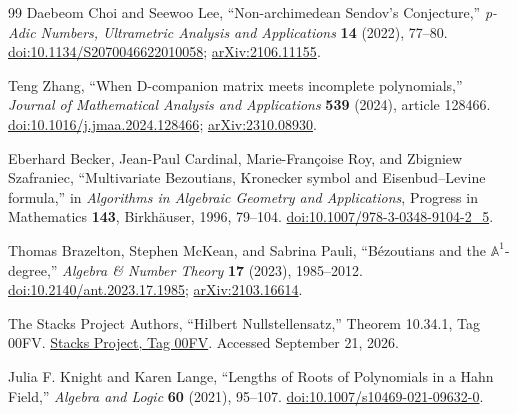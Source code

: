 \documentclass[11pt,letterpaper,oneside]{article}
\numberwithin{equation}{section}
\theoremstyle{definition}
\theoremstyle{remark}\newtheorem{remark}[theorem]{Remark}
\begin{document}
\begin{thebibliography}{99}
Daebeom Choi and Seewoo Lee, ``Non-archimedean Sendov's Conjecture,''
\emph{p-Adic Numbers, Ultrametric Analysis and Applications}
\textbf{14} (2022), 77--80.
\href{https://doi.org/10.1134/S2070046622010058}{doi:10.1134/S2070046622010058};
\href{https://arxiv.org/abs/2106.11155}{arXiv:2106.11155}.

Teng Zhang, ``When D-companion matrix meets incomplete polynomials,''
\emph{Journal of Mathematical Analysis and Applications}
\textbf{539} (2024), article 128466.
\href{https://doi.org/10.1016/j.jmaa.2024.128466}{doi:10.1016/j.jmaa.2024.128466};
\href{https://arxiv.org/abs/2310.08930}{arXiv:2310.08930}.

Eberhard Becker, Jean-Paul Cardinal, Marie-Fran\c{c}oise Roy,
and Zbigniew Szafraniec,
``Multivariate Bezoutians, Kronecker symbol and Eisenbud--Levine formula,''
in \emph{Algorithms in Algebraic Geometry and Applications},
Progress in Mathematics \textbf{143}, Birkh\"auser, 1996, 79--104.
\href{https://doi.org/10.1007/978-3-0348-9104-2_5}{doi:10.1007/978-3-0348-9104-2\_5}.

Thomas Brazelton, Stephen McKean, and Sabrina Pauli,
``B\'ezoutians and the $\mathbb A^1$-degree,''
\emph{Algebra \& Number Theory} \textbf{17} (2023), 1985--2012.
\href{https://doi.org/10.2140/ant.2023.17.1985}{doi:10.2140/ant.2023.17.1985};
\href{https://arxiv.org/abs/2103.16614}{arXiv:2103.16614}.

The Stacks Project Authors,
``Hilbert Nullstellensatz,'' Theorem 10.34.1, Tag 00FV.
\href{https://stacks.math.columbia.edu/tag/00FV}{Stacks Project, Tag 00FV}.
Accessed September 21, 2026.

Julia F. Knight and Karen Lange,
``Lengths of Roots of Polynomials in a Hahn Field,''
\emph{Algebra and Logic} \textbf{60} (2021), 95--107.
\href{https://doi.org/10.1007/s10469-021-09632-0}{doi:10.1007/s10469-021-09632-0}.

\end{thebibliography}
\end{document}
